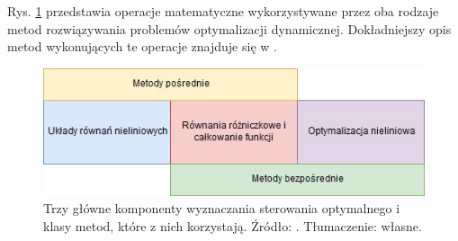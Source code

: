 Rys. \ref{fig:num-methods} przedstawia operacje matematyczne wykorzystywane przez oba rodzaje metod rozwiązywania problemów optymalizacji dynamicznej. Dokładniejszy opis metod wykonujących te operacje znajduje się w \cite{Rao2010}.

\begin{figure}[htp]
    \centering
    \includegraphics[scale=0.8]{Grafika/num-methods}
    \caption{Trzy główne komponenty wyznaczania sterowania optymalnego i klasy metod, które z nich korzystają. Źródło: \cite{Rao2010}. Tłumaczenie: własne.}
    \label{fig:num-methods}
\end{figure}
